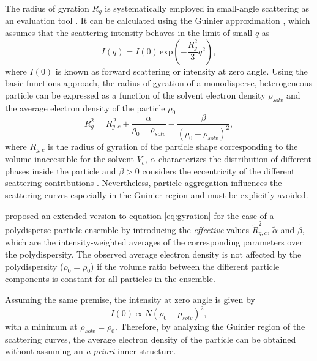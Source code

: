 The radius of gyration \( R_g\) is systematically employed in small-angle scattering as an evaluation tool \cite{mertens_structural_2010,sim_salt_2012}. It can be calculated using the Guinier approximation \cite{guinier_diffraction_1939,guinier_small-angle_1955}, which assumes that the scattering intensity behaves in the limit of small \(q\) as
\begin{equation}
\label{eq:guinier}
I(q)=I(0)\,\mbox{exp}\left(-\frac{R_g^2}{3}q^2\right),
\end{equation}
where \( I(0)\) is known as forward scattering or intensity at zero angle. Using the basic functions approach, the radius of gyration of a monodisperse, heterogeneous particle can be expressed as a function of the solvent electron density \( \rho_{solv} \) and the average electron density of the particle \( \rho_0 \) \cite{feigin_structure_1987}
\begin{equation}
R_g^2=R_{g,c}^{\,2}+\frac{\alpha}{\rho_0-\rho_{solv}}-\frac{\beta}{(\rho_0-\rho_{solv})^2},
\label{eq:gyration}
\end{equation}
where \(R_{g,c}\) is the radius of gyration of the particle shape corresponding to the volume inaccessible for the solvent \( V_c \), \( \alpha \) characterizes the distribution of different phases inside the particle and \( \beta>0 \) considers the eccentricity of the different scattering contributions \cite{stuhrmann_small-angle_2008}. Nevertheless, particle aggregation influences the scattering curves especially in the Guinier region and must be explicitly avoided.

\cite{avdeev_contrast_2007} proposed an extended version to equation \eqref{eq:gyration} for the case of a polydisperse particle ensemble by introducing the \emph{effective} values \( \tilde R^2_{g,c} \), \( \tilde \alpha \) and \( \tilde \beta \), which are the intensity-weighted averages of the corresponding parameters over the polydispersity. The observed average electron density is not affected by the polydispersity (\( \tilde\rho_0=\rho_0 \)) if the volume ratio between the different particle components is constant for all particles in the ensemble.

Assuming the same premise, the intensity at zero angle is given by
\begin{equation}
\label{eq:I0}
I(0)\propto N \left( \rho_0-\rho_{solv} \right)^2 ,
\end{equation}
with a minimum at \( \rho_{solv}=\rho_0 \). Therefore, by analyzing the Guinier region of the scattering curves, the average electron density of the particle can be obtained without assuming an \emph{a priori} inner structure.


